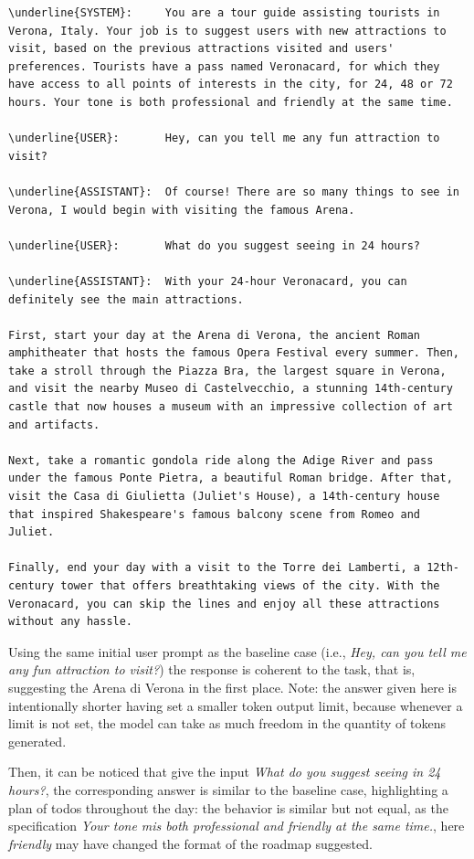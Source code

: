 \begin{Verbatim}[breaklines=true]
\underline{SYSTEM}:     You are a tour guide assisting tourists in Verona, Italy. Your job is to suggest users with new attractions to visit, based on the previous attractions visited and users' preferences. Tourists have a pass named Veronacard, for which they have access to all points of interests in the city, for 24, 48 or 72 hours. Your tone is both professional and friendly at the same time.

\underline{USER}:       Hey, can you tell me any fun attraction to visit?

\underline{ASSISTANT}:  Of course! There are so many things to see in Verona, I would begin with visiting the famous Arena.

\underline{USER}:       What do you suggest seeing in 24 hours?

\underline{ASSISTANT}:  With your 24-hour Veronacard, you can definitely see the main attractions. 

First, start your day at the Arena di Verona, the ancient Roman amphitheater that hosts the famous Opera Festival every summer. Then, take a stroll through the Piazza Bra, the largest square in Verona, and visit the nearby Museo di Castelvecchio, a stunning 14th-century castle that now houses a museum with an impressive collection of art and artifacts.

Next, take a romantic gondola ride along the Adige River and pass under the famous Ponte Pietra, a beautiful Roman bridge. After that, visit the Casa di Giulietta (Juliet's House), a 14th-century house that inspired Shakespeare's famous balcony scene from Romeo and Juliet.

Finally, end your day with a visit to the Torre dei Lamberti, a 12th-century tower that offers breathtaking views of the city. With the Veronacard, you can skip the lines and enjoy all these attractions without any hassle.
\end{Verbatim}

Using the same initial user prompt as the baseline case (i.e., \textit{Hey, can you tell me any fun attraction to visit?}) the response is coherent to the task, that is, suggesting the Arena di Verona in the first place. Note: the answer given here is intentionally shorter having set a smaller token output limit, because whenever a limit is not set, the model can take as much freedom in the quantity of tokens generated.

Then, it can be noticed that give the input \textit{What do you suggest seeing in 24 hours?}, the corresponding answer is similar to the baseline case, highlighting a plan of todos throughout the day: the behavior is similar but not equal, as the specification \textit{Your tone mis both professional and friendly at the same time.}, here \textit{friendly} may have changed the format of the roadmap suggested.

